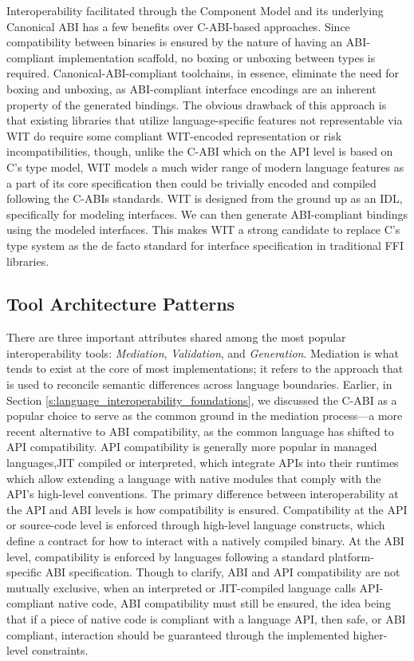 Interoperability facilitated through the Component Model and its underlying Canonical ABI has a few benefits over C-ABI-based approaches. Since compatibility between binaries is ensured by the nature of having an ABI-compliant implementation scaffold, no boxing or unboxing between types is required. Canonical-ABI-compliant toolchains, in essence, eliminate the need for boxing and unboxing, as ABI-compliant interface encodings are an inherent property of the generated bindings. The obvious drawback of this approach is that existing libraries that utilize language-specific features not representable via WIT do require some compliant WIT-encoded representation or risk incompatibilities, though, unlike the C-ABI which on the API level is based on C's type model, WIT models a much wider range of modern language features as a part of its core specification then could be trivially encoded and compiled following the C-ABIs standards. WIT is designed from the ground up as an IDL, specifically for modeling interfaces. We can then generate ABI-compliant bindings using the modeled interfaces. This makes WIT a strong candidate to replace C's type system as the de facto standard for interface specification in traditional FFI libraries.

\subsection{Tool Architecture Patterns}\label{s:interoperability_tools_and_techniques}

There are three important attributes shared among the most popular interoperability tools: \textit{Mediation}, \textit{Validation}, and \textit{Generation}. Mediation is what tends to exist at the core of most implementations; it refers to the approach that is used to reconcile semantic differences across language boundaries. Earlier, in Section \ref{s:language_interoperability_foundations}, we discussed the C-ABI as a popular choice to serve as the common ground in the mediation process—a more recent alternative to ABI compatibility, as the common language has shifted to API compatibility. API compatibility is generally more popular in managed languages,\ie JIT compiled or interpreted, which integrate APIs into their runtimes which allow extending a language with native modules that comply with the API's high-level conventions. The primary difference between interoperability at the API and ABI levels is how compatibility is ensured. Compatibility at the API or source-code level is enforced through high-level language constructs, which define a contract for how to interact with a natively compiled binary. At the ABI level, compatibility is enforced by languages following a standard platform-specific ABI specification. Though to clarify, ABI and API compatibility are not mutually exclusive, when an interpreted or JIT-compiled language calls API-compliant native code, ABI compatibility must still be ensured, the idea being that if a piece of native code is compliant with a language API, then safe, or ABI compliant, interaction should be guaranteed through the implemented higher-level constraints. 

